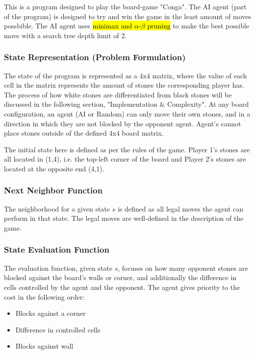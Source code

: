 \documentclass{article}
\begin{document}
This is a program designed to play the board-game "Conga".
The AI agent (part of the program) is designed to try and win the game in the least amount of moves possbible.
The AI agent uses \hl{minimax and $\alpha$-$\beta$ pruning} to make the best possible move with a search tree depth limit of 2.

\subsubsection{State Representation (Problem Formulation)}

The state of the program is represented as a 4x4 matrix, where the value of each cell in the matrix represents the amount of stones the corresponding player has.
The process of how white stones are differentiated from black stones will be discussed in the following section, "Implementation \& Complexity".
At any board configuration, an agent (AI or Random) can only move their own stones, and in a direction in which they are not blocked by the opponent agent.
Agent's cannot place stones outside of the defined 4x4 board matrix.

\setlength{\parskip}{6pt}

The initial state here is defined as per the rules of the game.
Player 1's stones are all located in (1,4), i.e. the top-left corner of the board and Player 2's stones are located at the opposite end (4,1).

\subsubsection{Next Neighbor Function}

The neighborhood for a given state $s$ is defined as all legal moves the agent can perform in that state. The legal moves are well-defined in the description of the game.

\subsubsection{State Evaluation Function}

The evaluation function, given state $s$, focuses on how many opponent stones are blocked against the board's walls or corner, and additionally the difference in cells controlled by the agent and the opponent.
The agent gives priority to the cost in the following order:

\begin{itemize}
    \item   {Blocks against a corner}
    \item   {Difference in controlled cells}
    \item   {Blocks against wall}
\end{itemize}
\end{document}
